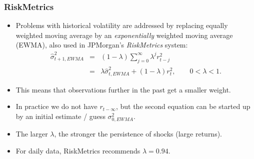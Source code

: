 \begin{frame}%

\frametitle{RiskMetrics}

\begin{itemize}
\item Problems with historical volatility are addressed by replacing equally
weigh\-ted moving average by an \emph{\color{red}exponentially} weighted
moving average (EWMA), also used in JPMorgan's \emph{\color{red}RiskMetrics}
system:%
\begin{eqnarray*}
\widehat{\sigma}_{t+1,EWMA}^{2}  &=&(1-\lambda )\sum_{j=0}^{\infty }\lambda
^{j}r_{t-j}^{2} \\
&=&\lambda\widehat{\sigma}_{t,EWMA}^{2}+(1-\lambda )r_{t}^{2},\qquad 0<\lambda <1.
\end{eqnarray*}
\item This means that observations further in the past get a smaller weight.

\item In practice we do not have $r_{t-\infty }$, but the second equation
can be started up by an initial estimate / guess $\sigma _{0,EWMA}^{2}$.
\item The larger $\lambda$, the stronger the persistence of shocks (large returns).
\item For daily data, RiskMetrics recommends $\lambda =0.94$.
\end{itemize}

\end{frame}%


